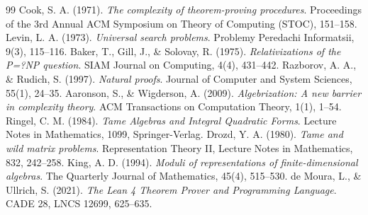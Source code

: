 \documentclass[11pt,a4paper]{article}
\theoremstyle{definition}
\begin{document}
\begin{thebibliography}{99}
 Cook, S. A. (1971). \textit{The complexity of theorem-proving procedures}. Proceedings of the 3rd Annual ACM Symposium on Theory of Computing (STOC), 151--158.
 Levin, L. A. (1973). \textit{Universal search problems}. Problemy Peredachi Informatsii, 9(3), 115--116.
 Baker, T., Gill, J., \& Solovay, R. (1975). \textit{Relativizations of the P=?NP question}. SIAM Journal on Computing, 4(4), 431--442.
 Razborov, A. A., \& Rudich, S. (1997). \textit{Natural proofs}. Journal of Computer and System Sciences, 55(1), 24--35.
 Aaronson, S., \& Wigderson, A. (2009). \textit{Algebrization: A new barrier in complexity theory}. ACM Transactions on Computation Theory, 1(1), 1--54.
 Ringel, C. M. (1984). \textit{Tame Algebras and Integral Quadratic Forms}. Lecture Notes in Mathematics, 1099, Springer-Verlag.
 Drozd, Y. A. (1980). \textit{Tame and wild matrix problems}. Representation Theory II, Lecture Notes in Mathematics, 832, 242--258.
 King, A. D. (1994). \textit{Moduli of representations of finite-dimensional algebras}. The Quarterly Journal of Mathematics, 45(4), 515--530.
 de Moura, L., \& Ullrich, S. (2021). \textit{The Lean 4 Theorem Prover and Programming Language}. CADE 28, LNCS 12699, 625--635.
\end{thebibliography}
\end{document}
